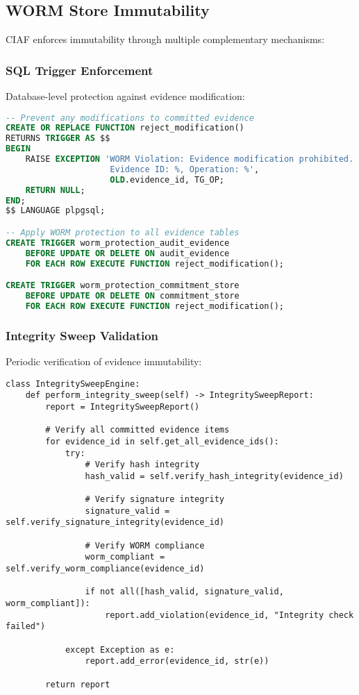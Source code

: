 \documentclass[12pt,a4paper]{article}
\begin{document}
\subsection{WORM Store Immutability}

CIAF enforces immutability through multiple complementary mechanisms:

\subsubsection{SQL Trigger Enforcement}

Database-level protection against evidence modification:

\begin{lstlisting}[language=SQL, caption=WORM SQL Triggers]
-- Prevent any modifications to committed evidence
CREATE OR REPLACE FUNCTION reject_modification()
RETURNS TRIGGER AS $$
BEGIN
    RAISE EXCEPTION 'WORM Violation: Evidence modification prohibited. 
                     Evidence ID: %, Operation: %', 
                     OLD.evidence_id, TG_OP;
    RETURN NULL;
END;
$$ LANGUAGE plpgsql;

-- Apply WORM protection to all evidence tables
CREATE TRIGGER worm_protection_audit_evidence
    BEFORE UPDATE OR DELETE ON audit_evidence
    FOR EACH ROW EXECUTE FUNCTION reject_modification();

CREATE TRIGGER worm_protection_commitment_store  
    BEFORE UPDATE OR DELETE ON commitment_store
    FOR EACH ROW EXECUTE FUNCTION reject_modification();
\end{lstlisting}

\subsubsection{Integrity Sweep Validation}

Periodic verification of evidence immutability:

\begin{lstlisting}[caption=Integrity Sweep Implementation]
class IntegritySweepEngine:
    def perform_integrity_sweep(self) -> IntegritySweepReport:
        report = IntegritySweepReport()
        
        # Verify all committed evidence items
        for evidence_id in self.get_all_evidence_ids():
            try:
                # Verify hash integrity
                hash_valid = self.verify_hash_integrity(evidence_id)
                
                # Verify signature integrity  
                signature_valid = self.verify_signature_integrity(evidence_id)
                
                # Verify WORM compliance
                worm_compliant = self.verify_worm_compliance(evidence_id)
                
                if not all([hash_valid, signature_valid, worm_compliant]):
                    report.add_violation(evidence_id, "Integrity check failed")
                    
            except Exception as e:
                report.add_error(evidence_id, str(e))
        
        return report
\end{lstlisting}
\end{document}
